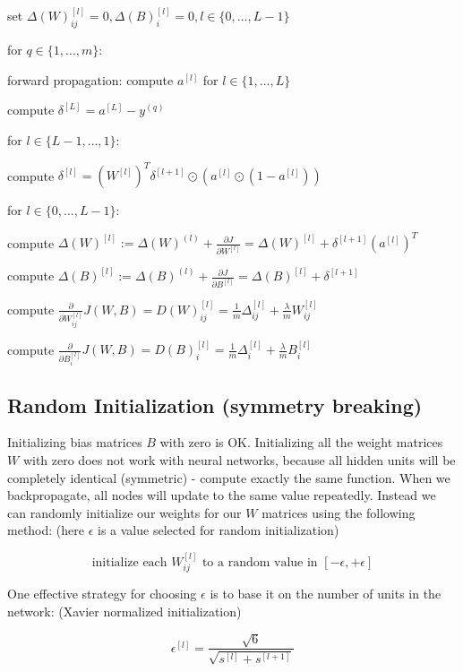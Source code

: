 \documentclass{article}
\begin{document}
\noindent set \(\Delta(W)_{ij}^{[l]} = 0, \Delta(B)_{i}^{[l]} = 0, l \in \{0, \dots, L - 1\}\)

\noindent for \(q \in \{1, \dots, m\}\):

\noindent \hspace{.5cm} forward propagation: compute \(a^{[l]}\) for \(l \in \{1, \dots, L\}\)

\noindent \hspace{.5cm} compute \(\delta^{[L]} = a^{[L]} - y^{(q)}\)

\noindent \hspace{.5cm} for \(l \in \{L - 1, \dots, 1\}\):

\noindent \hspace{1cm} compute \(\delta^{[l]} = (W^{[l]})^T \delta^{[l + 1]} \odot (a^{[l]} \odot (1 - a^{[l]}))\)

\noindent \hspace{.5cm} for \(l \in \{0, \dots, L - 1\}\):

\noindent \hspace{1cm} compute \(\Delta(W)^{[l]} := \Delta(W)^{(l)} + \frac{\partial J}{\partial W^{[l]}} = \Delta(W)^{[l]} + \delta^{[l + 1]}(a^{[l]})^T\)

\noindent \hspace{1cm} compute \(\Delta(B)^{[l]} := \Delta(B)^{(l)} + \frac{\partial J}{\partial B^{[l]}} = \Delta(B)^{[l]} + \delta^{[l + 1]}\)

\noindent compute \(\frac{\partial}{\partial W_{ij}^{[l]}} J(W, B) = D(W)_{ij}^{[l]} = \frac{1}{m} \Delta_{ij}^{[l]} + \frac{\lambda}{m} W_{ij}^{[l]}\)

\noindent compute \(\frac{\partial}{\partial B_{i}^{[l]}} J(W, B) = D(B)_{i}^{[l]} = \frac{1}{m} \Delta_{i}^{[l]} + \frac{\lambda}{m} B_{i}^{[l]}\)

\subsection{Random Initialization (symmetry breaking)}

\noindent Initializing bias matrices \(B\) with zero is OK. Initializing all the weight matrices \(W\) with zero does not work with neural networks, because all hidden units will be completely identical (symmetric) - compute exactly the same function. When we backpropagate, all nodes will update to the same value repeatedly. Instead we can randomly initialize our weights for our \(W\) matrices using the following method: (here \(\epsilon\) is a value selected for random initialization)

\[\text{initialize each } W_{ij}^{[l]} \text{ to a random value in } [-\epsilon, +\epsilon]\]

\noindent One effective strategy for choosing \(\epsilon\) is to base it on the number of units in the network: (Xavier normalized initialization)

\[\epsilon^{[l]} = \frac{\sqrt{6}}{\sqrt{s^{[l]} + s^{[l + 1]}}}\]

\printindex
\end{document}
